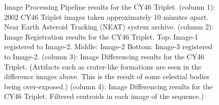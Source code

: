 \begin{figure}[h]
\begin{center}
\end{center}
\vspace{-0.7cm}
\caption[caption]{Image Processing Pipeline results for the CY46 Triplet. (column 1): 2002 CY46 Triplet images taken approximately 10 minutes apart. Near Earth Asteroid Tracking (NEAT) system archive. 
(column 2): Image Registration results for the CY46 Triplet.  Top: Image-1 registered to Image-2. Middle: Image-2 Bottom: Image-3 registered to Image-2. 
(column 3): Image Differencing results for the CY46 Triplet. (Artifacts such as crater-like formations are seen in the difference images above. This is the result of some celestial bodies being over-exposed.) 
(column 4): Image Differencing results for the CY46 Triplet. Filtered centroids in each image of the sequence.)}
\label{IPP_NEAT_Layout2}
\end{figure}

